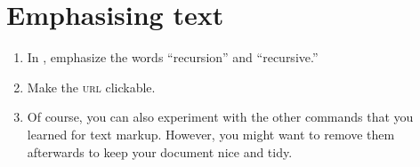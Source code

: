 \section{Emphasising text}

\begin{enumerate}
  \item In , emphasize the words 
  ``recursion'' and ``recursive.''
  \item Make the \textsc{url} clickable. 
  \item Of course, you can also experiment with the other commands that you learned for text markup. However, you might want to remove them afterwards to keep your document nice and tidy.
\end{enumerate}


